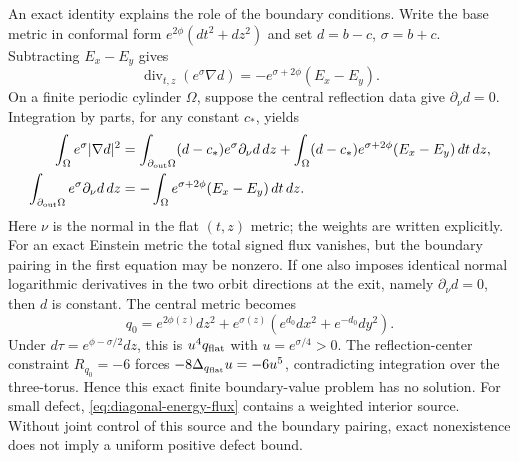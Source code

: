 \documentclass[a4paper,11pt]{article}
\numberwithin{equation}{section}
\theoremstyle{definition}
\begin{document}
An exact identity explains the role of the boundary conditions. Write the base metric in conformal form $e^{2\phi}(dt^2+dz^2)$ and set $d=b-c$, $\sigma=b+c$.
Subtracting $E_x-E_y$ gives
\begin{equation}\label{eq:diagonal-forced-flux}
 \operatorname{div}_{t,z}(e^\sigma\nabla d)
 =-e^{\sigma+2\phi}(E_x-E_y).
\end{equation}
On a finite periodic cylinder $\Omega$, suppose the central reflection data give $\partial_\nu d=0$.
Integration by parts, for any constant $c_*$, yields
\begin{align}
 \int_\Omega e^\sigma|\nabla d|^2
 &=\int_{\partial_{\rm out}\Omega}(d-c_*)e^\sigma\partial_\nu d\,dz
   +\int_\Omega(d-c_*)e^{\sigma+2\phi}(E_x-E_y)\,dt\,dz,
   \label{eq:diagonal-energy-flux}\\
 \int_{\partial_{\rm out}\Omega}e^\sigma\partial_\nu d\,dz
 &=-\int_\Omega e^{\sigma+2\phi}(E_x-E_y)\,dt\,dz.\nonumber
\end{align}
Here $\nu$ is the normal in the flat $(t,z)$ metric; the weights are written explicitly.
For an exact Einstein metric the total signed flux vanishes, but the boundary pairing in the first equation may be nonzero.
If one also imposes identical normal logarithmic derivatives in the two orbit directions at the exit, namely $\partial_\nu d=0$, then $d$ is constant. The central metric becomes
\[
 q_0=e^{2\phi(z)}dz^2+e^{\sigma(z)}
       (e^{d_0}dx^2+e^{-d_0}dy^2).
\]
Under $d\tau=e^{\phi-\sigma/2}dz$, this is $u^4q_{\rm flat}$ with $u=e^{\sigma/4}>0$.
The reflection-center constraint $R_{q_0}=-6$ forces $-8\Delta_{q_{\rm flat}}u=-6u^5$, contradicting integration over the three-torus.
Hence this exact finite boundary-value problem has no solution.
For small defect, \eqref{eq:diagonal-energy-flux} contains a weighted interior source. Without joint control of this source and the boundary pairing, exact nonexistence does not imply a uniform positive defect bound.
\end{document}
